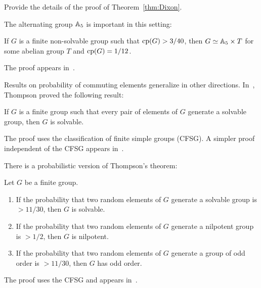 \begin{bonus}
    Provide the details of the proof of Theorem~\ref{thm:Dixon}.
\end{bonus}

\begin{optional}
    
The alternating group $\mathbb{A}_5$ is important in this setting:

\begin{theorem}
    If $G$ is a finite non-solvable group such that $\operatorname{cp}(G)>3/40$, then
    $G\simeq\mathbb{A}_5\times T$ for some abelian group 
    $T$ and $\operatorname{cp}(G)=1/12$. 
\end{theorem}

The proof appears in~\cite{MR2228209}.

Results on probability of commuting elements generalize in other directions. 
In~\cite{MR230809,MR276325,MR313378,MR369512}, 
Thompson proved the following result:

\begin{theorem}[Thompson]
    If $G$ is a finite group such that 
    every pair of elements of $G$ generate
    a solvable group, then $G$ is solvable. 
\end{theorem}

The proof uses the classification of finite simple groups (CFSG). A simpler
proof independent of the CFSG appears in~\cite{MR1346207}.

There is a probabilistic version of Thompson's theorem:

\begin{theorem}
    Let $G$ be a finite group.
    \begin{enumerate}
        \item If the probability that two random elements of $G$ 
        generate a solvable group is $>11/30$, then $G$ is solvable. 
        \item If the probability that two random elements of $G$ 
        generate a nilpotent group is $>1/2$, then $G$ is nilpotent.
        \item If the probability that two random elements of $G$ 
        generate a group of odd order is $>11/30$, then $G$ has odd order.
    \end{enumerate}
\end{theorem}

The proof uses the CFSG and appears in~\cite{MR1770615}.
\end{optional}


